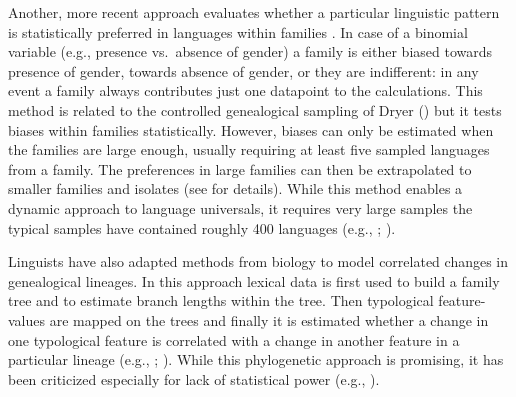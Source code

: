 \documentclass[output=collectionpaper]{langsci/langscibook}
\begin{document}
Another, more recent approach evaluates whether a particular linguistic pattern is statistically preferred in languages within families \citep{Bickel2013b}. In case of a binomial variable (e.g., presence vs.\ absence of gender) a family is either biased towards presence of gender, towards absence of gender, or they are indifferent: in any event a family always contributes just one datapoint to the calculations. This method is related to the controlled genealogical sampling of Dryer (\citeyear{Dryer1992,Dryer2000}) but it tests biases within families statistically. However, biases can only be estimated when the families are large enough, usually requiring at least five sampled languages from a family. The preferences in large families can then be extrapolated to smaller families and isolates (see \citealt{Bickel2013b} for details). While this method enables a dynamic approach to language universals, it requires very large samples \textendash{} the typical samples have contained roughly 400 languages (e.g., \citealt{Bickel2013b}; \citealt{Bickel2014}).

Linguists have also adapted methods from biology to model correlated changes in genealogical lineages. In this approach lexical data is first used to build a family tree and to estimate branch lengths within the tree. Then typological feature-values are mapped on the trees and finally it is estimated whether a change in one typological feature is correlated with a change in another feature in a particular lineage (e.g., \citealt{Dunn2011}; \citealt{Levinson2011}). While this phylogenetic approach is promising, it has been criticized especially for lack of statistical power (e.g., \citealt{Cysouw2011}).
\end{document}
